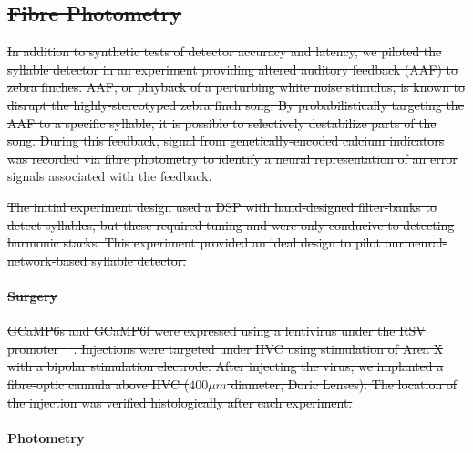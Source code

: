 \documentclass[10pt,letterpaper]{article}
\renewcommand{\subsubsection}[1]{\paragraph{#1}}
\providecommand{\DIFdeltex}[1]{{\protect\color{red}\sout{#1}}}                      %
\providecommand{\DIFdelbegin}{} %
\providecommand{\DIFdel}[1]{\texorpdfstring{\DIFdeltex{#1}}{}} %
\begin{document}
\DIFdelbegin \subsection{\DIFdel{Fibre Photometry}}
\addtocounter{subsection}{-1}%

\DIFdel{In addition to synthetic tests of detector accuracy and 
latency, we piloted the syllable detector in an experiment
providing altered auditory feedback (AAF) to zebra finches. AAF, or 
playback of a perturbing white noise stimulus, is known to disrupt 
the highly-stereotyped zebra finch song. By probabilistically 
targeting the AAF to a specific syllable, it is possible 
to selectively destabilize parts of the song. During this 
feedback, signal from genetically-encoded calcium indicators was 
recorded via fibre photometry to identify a neural representation of 
an error signals associated with the feedback.
}%

\DIFdel{The initial experiment design used a DSP with hand-designed filter-banks to
detect syllables, but these required tuning and were only conducive
to detecting harmonic stacks. This experiment provided an ideal design
to pilot our neural-network-based syllable detector.
}%

\subsubsection{\DIFdel{Surgery}}
\addtocounter{subsubsection}{-1}%

\DIFdel{GCaMP6s and GCaMP6f were expressed using a lentivirus under the RSV 
promoter \mbox{%
\cite{Markowitz:2015ko}}%
. Injections were targeted under HVC 
using stimulation of Area X with a bipolar stimulation electrode. 
After injecting the virus, we implanted a fibre-optic cannula above 
HVC ($400 \mu m$ diameter, Doric Lenses). The location of the injection 
was verified histologically after each experiment.
}%

\subsubsection{\DIFdel{Photometry}}
\addtocounter{subsubsection}{-1}%
\end{document}
